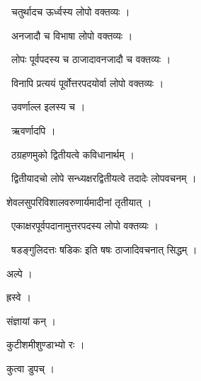 \documentclass[10pt, openany, oneside]{book}
\begin{document}
\par\noindent\hspace{1.5em}{\vps वा॰}~{\qt चतुर्थादच ऊर्ध्वस्य लोपो वक्तव्यः ।}

\par\noindent\hspace{1.5em}{\vps वा॰}~{\qt अनजादौ च विभाषा लोपो वक्तव्यः ।}

\par\noindent\hspace{1.5em}{\vps वा॰}~{\qt लोपः पूर्वपदस्य च ठाजादावनजादौ च वक्तव्यः ।}

\par\noindent\hspace{1.5em}{\vps वा॰}~{\qt विनापि प्रत्ययं पूर्वोत्तरपदयोर्वा लोपो वक्तव्यः ।}

\par\noindent\hspace{1.5em}{\vps वा॰}~{\qt उवर्णाल्ल इलस्य च  ।}

\par\noindent\hspace{1.5em}{\vps वा॰}~{\qt ऋवर्णादपि ।}

\par\noindent\hspace{1.5em}{\vps वा॰}~{\qt ठग्रहणमुको द्वितीयत्वे कविधानार्थम् ।}

\par\noindent\hspace{1.5em}{\vps वा॰}~{\qt द्वितीयादचो लोपे सन्ध्यक्षरद्वितीयत्वे तदादेः लोपवचनम् ।}

\noindent शेवलसुपरिविशालवरुणार्यमादीनां तृतीयात् ।

\par\noindent\hspace{1.5em}{\vps वा॰}~{\qt एकाक्षरपूर्वपदानामुत्तरपदस्य लोपो वक्तव्यः ।}

\par\noindent\hspace{1.5em}{\vps वा॰}~{\qt षडङ्गुलिदत्तः षडिकः इति षषः ठाजादिवचनात् सिद्धम् ।}

\noindent अल्पे ।

\noindent ह्रस्वे ।

\noindent संज्ञायां कन् ।

\noindent कुटीशमीशुण्डाभ्यो रः ।

\noindent कुत्वा डुपच् ।
\end{document}
